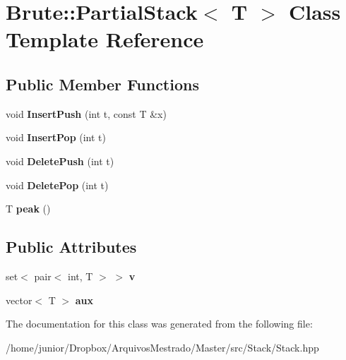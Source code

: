 \hypertarget{classBrute_1_1PartialStack}{}\section{Brute\+:\+:Partial\+Stack$<$ T $>$ Class Template Reference}
\label{classBrute_1_1PartialStack}
\subsection*{Public Member Functions}
\begin{DoxyCompactItemize}
\item 
\mbox{\label{classBrute_1_1PartialStack_a9b35f39e3d2a3b6af1599dfe8a9dc83d}} 
void {\bfseries Insert\+Push} (int t, const T \&x)
\item 
\mbox{\label{classBrute_1_1PartialStack_a347ebf205dac4ad1976180b1ec897af8}} 
void {\bfseries Insert\+Pop} (int t)
\item 
\mbox{\label{classBrute_1_1PartialStack_af872304f5d93e50b1e704dc8f6b13d34}} 
void {\bfseries Delete\+Push} (int t)
\item 
\mbox{\label{classBrute_1_1PartialStack_a345e85a410547bd21dffe1bb05879c49}} 
void {\bfseries Delete\+Pop} (int t)
\item 
\mbox{\label{classBrute_1_1PartialStack_a75cea8d95032298fabb08de150190045}} 
T {\bfseries peak} ()
\end{DoxyCompactItemize}
\subsection*{Public Attributes}
\begin{DoxyCompactItemize}
\item 
\mbox{\label{classBrute_1_1PartialStack_a104945503f4e42d959681d320dd6b261}} 
set$<$ pair$<$ int, T $>$ $>$ {\bfseries v}
\item 
\mbox{\label{classBrute_1_1PartialStack_a1c53111c326f1845aed9a4238dae21e4}} 
vector$<$ T $>$ {\bfseries aux}
\end{DoxyCompactItemize}


The documentation for this class was generated from the following file\+:\begin{DoxyCompactItemize}
\item 
/home/junior/\+Dropbox/\+Arquivos\+Mestrado/\+Master/src/\+Stack/Stack.\+hpp\end{DoxyCompactItemize}
